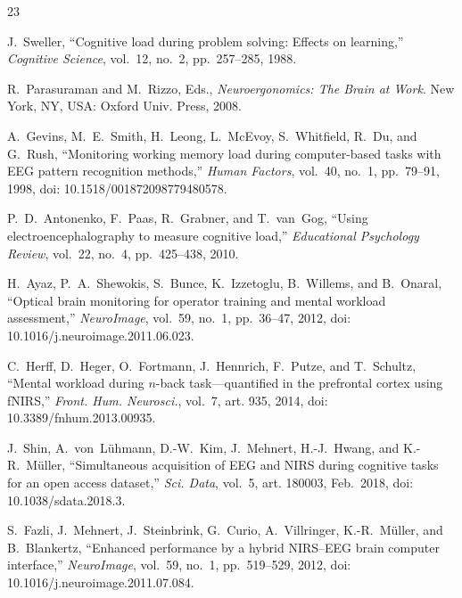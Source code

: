 \documentclass[conference]{IEEEtran}
\begin{document}
\balance


\begin{thebibliography}{23}

J.~Sweller, ``Cognitive load during problem solving: Effects on learning,'' \textit{Cognitive Science}, vol.~12, no.~2, pp.~257--285, 1988.

R.~Parasuraman and M.~Rizzo, Eds., \textit{Neuroergonomics: The Brain at Work}. New York, NY, USA: Oxford Univ. Press, 2008.

A.~Gevins, M.~E.~Smith, H.~Leong, L.~McEvoy, S.~Whitfield, R.~Du, and G.~Rush, ``Monitoring working memory load during computer-based tasks with EEG pattern recognition methods,'' \textit{Human Factors}, vol.~40, no.~1, pp.~79--91, 1998, doi: 10.1518/001872098779480578.

P.~D.~Antonenko, F.~Paas, R.~Grabner, and T.~van~Gog, ``Using electroencephalography to measure cognitive load,'' \textit{Educational Psychology Review}, vol.~22, no.~4, pp.~425--438, 2010.

H.~Ayaz, P.~A.~Shewokis, S.~Bunce, K.~Izzetoglu, B.~Willems, and B.~Onaral, ``Optical brain monitoring for operator training and mental workload assessment,'' \textit{NeuroImage}, vol.~59, no.~1, pp.~36--47, 2012, doi: 10.1016/j.neuroimage.2011.06.023.

C.~Herff, D.~Heger, O.~Fortmann, J.~Hennrich, F.~Putze, and T.~Schultz, ``Mental workload during $n$-back task---quantified in the prefrontal cortex using fNIRS,'' \textit{Front. Hum. Neurosci.}, vol.~7, art. 935, 2014, doi: 10.3389/fnhum.2013.00935.

J.~Shin, A.~von~L\"{u}hmann, D.-W.~Kim, J.~Mehnert, H.-J.~Hwang, and K.-R.~M\"{u}ller, ``Simultaneous acquisition of EEG and NIRS during cognitive tasks for an open access dataset,'' \textit{Sci. Data}, vol.~5, art. 180003, Feb.\ 2018, doi: 10.1038/sdata.2018.3.

S.~Fazli, J.~Mehnert, J.~Steinbrink, G.~Curio, A.~Villringer, K.-R.~M\"{u}ller, and B.~Blankertz, ``Enhanced performance by a hybrid NIRS--EEG brain computer interface,'' \textit{NeuroImage}, vol.~59, no.~1, pp.~519--529, 2012, doi: 10.1016/j.neuroimage.2011.07.084.


\end{thebibliography}
\end{document}
